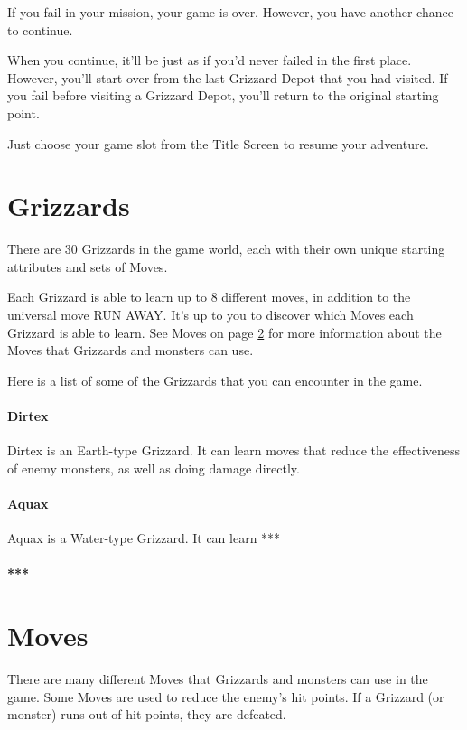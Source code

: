 \documentclass[12pt,twoside]{memoir}
\begin{document}
\begin{description}
If you fail in your mission, your game is over. However, you have
another chance to continue.

When you continue, it'll  be just as if you'd never  failed in the first
place. However, you'll start over from  the last Grizzard Depot that you
had visited. If you fail before visiting a Grizzard Depot, you'll return
to the original starting point.

Just choose your game slot from the Title Screen to resume your
adventure.

\chapter{Grizzards}

There are  30 Grizzards in  the game world,  each with their  own unique
starting attributes and sets of Moves.

Each Grizzard is able  to learn up to 8 different  moves, in addition to
the universal move RUN AWAY. It's up to you to discover which Moves each
Grizzard  is able  to  learn. See  Moves on  page  \ref{Moves} for  more
information about the Moves that Grizzards and monsters can use.

Here  is a  list of  some of  the Grizzards  that you  can encounter  in
the game.

\subsubsection{Dirtex}

Dirtex is  an Earth-type Grizzard.  It can  learn moves that  reduce the
effectiveness of enemy monsters, as well as doing damage directly.

\subsubsection{Aquax}

Aquax is a Water-type Grizzard. It can learn ***

\subsubsection{***}

\chapter{Moves}\label{Moves}

There are  many different Moves that  Grizzards and monsters can  use in
the  game.  Some Moves  are  used  to  reduce  the enemy's  hit  points.
If a Grizzard (or monster) runs out of hit points, they are defeated.


\end{description}
\end{document}
